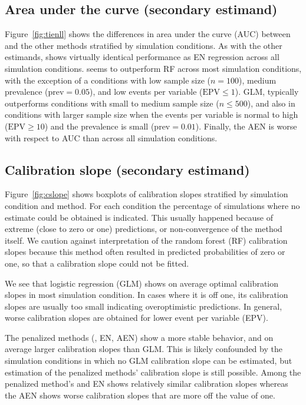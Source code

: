 \subsection{Area under the curve (secondary estimand)}
Figure~\ref{fig:tienll} shows the differences in area under the curve (AUC)
between \ainet{} and the other methods stratified by simulation conditions.
As with the other estimands, \ainet{} shows virtually identical performance
as EN regression across all simulation conditions.
\ainet{} seems to outperform RF across most simulation conditions, with the
exception of a conditions with low sample size ($n = 100$), medium prevalence
($\mbox{prev} = 0.05$), and low events per variable ($\mbox{EPV} \leq 1$).
GLM, typically outperforms \ainet{} conditions with small to medium sample size
($n \leq 500$), and also in conditions with larger sample size when the
events per variable is normal to high ($\mbox{EPV} \geq 10$) and the prevalence
is small ($\mbox{prev}  = 0.01$).
Finally, the AEN is worse with respect to AUC than \ainet{} across all
simulation conditions.

\subsection{Calibration slope (secondary estimand)}
Figure~\ref{fig:cslope} shows boxplots of calibration slopes stratified by
simulation condition and method. For each condition the percentage of
simulations where no estimate could be obtained is indicated. This usually
happened because of extreme (close to zero or one) predictions, or
non-convergence of the method itself. We caution against interpretation of the
random forest (RF) calibration slopes because this method often resulted in
predicted probabilities of zero or one, so that a calibration slope could not
be fitted.

We see that logistic regression (GLM) shows on average optimal calibration slopes
in most simulation condition. In cases where it is off one, its calibration
slopes are usually too small indicating overoptimistic predictions. In general,
worse calibration slopes are obtained for lower event per variable (EPV).

The penalized methods (\ainet{}, EN, AEN) show a more stable behavior, and on
average larger calibration slopes than GLM. This is likely confounded by the
simulation conditions in which no GLM calibration slope can be estimated, but
estimation of the penalized methods' calibration slope is still possible. Among
the penalized method's \ainet{} and EN shows relatively similar calibration
slopes whereas the AEN shows worse calibration slopes that are more off the
value of one.

